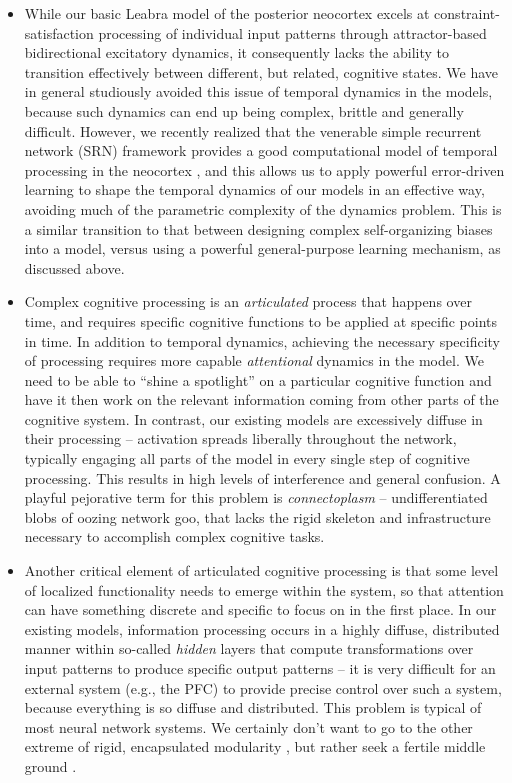\documentclass[11pt,twoside]{article}
\newif\myifpdf
\begin{document}
\begin{itemize}

\item While our basic Leabra model of the posterior neocortex excels at constraint-satisfaction processing of individual input patterns through attractor-based bidirectional excitatory dynamics, it consequently lacks the ability to transition effectively between different, but related, cognitive states.  We have in general studiously avoided this issue of temporal dynamics in the models, because such dynamics can end up being complex, brittle and generally difficult.  However, we recently realized that the venerable simple recurrent network (SRN) framework \cite{Elman90} provides a good computational model of temporal processing in the neocortex \cite{OReillyWyatteRohrlich14}, and this allows us to apply powerful error-driven learning to shape the temporal dynamics of our models in an effective way, avoiding much of the parametric complexity of the dynamics problem.  This is a similar transition to that between designing complex self-organizing biases into a model, versus using a powerful general-purpose learning mechanism, as discussed above.

\item Complex cognitive processing is an {\em articulated} process that happens over time, and requires specific cognitive functions to be applied at specific points in time.  In addition to temporal dynamics, achieving the necessary specificity of processing requires more capable {\em attentional} dynamics in the model.  We need to be able to ``shine a spotlight'' on a particular cognitive function and have it then work on the relevant information coming from other parts of the cognitive system.  In contrast, our existing models are excessively diffuse in their processing -- activation spreads liberally throughout the network, typically engaging all parts of the model in every single step of cognitive processing.  This results in high levels of interference and general confusion.  A playful pejorative term for this problem is {\em connectoplasm} -- undifferentiated blobs of oozing network goo, that lacks the rigid skeleton and infrastructure necessary to accomplish complex cognitive tasks.

\item Another critical element of articulated cognitive processing is that some level of localized functionality needs to emerge within the system, so that attention can have something discrete and specific to focus on in the first place.  In our existing models, information processing occurs in a highly diffuse, distributed manner within so-called {\em hidden} layers that compute transformations over input patterns to produce specific output patterns -- it is very difficult for an external system (e.g., the PFC) to provide precise control over such a system, because everything is so diffuse and distributed.  This problem is typical of most neural network systems.  We certainly don't want to go to the other extreme of rigid, encapsulated modularity \cite{FodorPylyshyn88}, but rather seek a fertile middle ground \cite{OReillyPetrovCohenEtAl14}.


\end{itemize}
\end{document}
